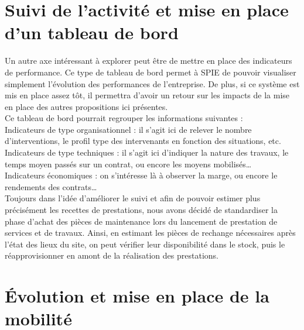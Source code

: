 
\section{Suivi de l’activité et mise en place d’un tableau de bord}

Un autre axe intéressant à explorer peut être de mettre en place des indicateurs de performance. 
Ce type de tableau de bord permet à SPIE de pouvoir visualiser simplement l’évolution des performances de l’entreprise. De plus, si ce système est mis en place assez tôt, il permettra d’avoir un retour sur les impacts de la mise en place des autres propositions ici présentes. \\

Ce tableau de bord pourrait regrouper les informations suivantes : \\
    
Indicateurs de type organisationnel : il s’agit ici de relever le nombre d’interventions, le profil type des intervenants en fonction des situations, etc.\\
Indicateurs de type techniques : il s’agit ici d’indiquer la nature des travaux, le temps moyen passés sur un contrat, ou encore les moyens mobilisés\dots \\
Indicateurs économiques : on s’intéresse là à observer la marge, ou encore le rendements des contrats\dots \\

Toujours dans l’idée d’améliorer le suivi et afin de pouvoir estimer plus précisément les recettes de prestations, nous avons décidé de standardiser la phase d’achat des pièces de maintenance lors du lancement de prestation de services et de travaux. Ainsi, en estimant les pièces de rechange nécessaires après l’état des lieux du site, on peut vérifier leur disponibilité dans le stock, puis le réapprovisionner en amont de la réalisation des prestations.

\section{Évolution et mise en place de la mobilité}

